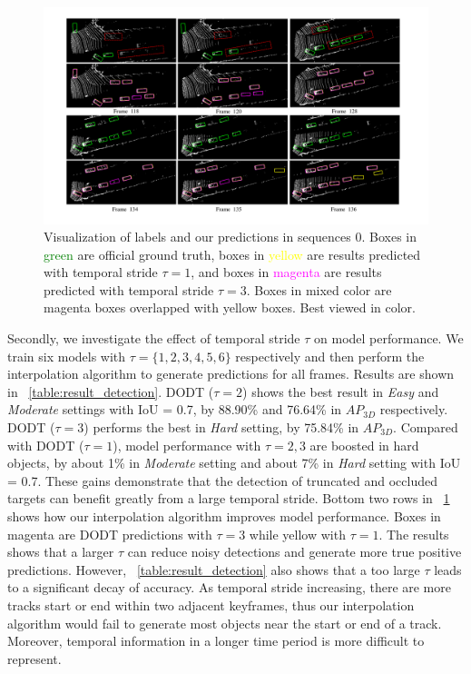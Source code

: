 \documentclass[letterpaper, 10pt, conference]{ieeeconf}  %
\begin{document}
\begin{figure}\centering
	\rule{0pt}{1ex}
	\begin{center}
		\includegraphics[trim={2cm, 1cm, 2cm, 1cm}, clip, width=\textwidth]{images/examples.pdf}
	\end{center}
	\setlength{\abovecaptionskip}{-3pt} 
	\caption{Visualization of labels and our predictions in sequences 0. Boxes in \textcolor{green}{green} are official ground truth, boxes in \textcolor{yellow}{yellow} are results predicted with temporal stride $\tau = 1$, and boxes in \textcolor{magenta}{magenta} are results predicted with temporal stride $\tau = 3$. Boxes in mixed color are magenta boxes overlapped with yellow boxes. Best viewed in color.}
	\label{fig:examples}
	\vspace{-0.4cm}
\end{figure}

Secondly, we investigate the effect of temporal stride $\tau$ on model performance. We train six models with $\tau = \{1, 2, 3, 4, 5, 6\}$ respectively and then perform the interpolation algorithm to generate predictions for all frames. Results are shown in \tablename \, \ref{table:result_detection}. DODT ($\tau = 2$) shows the best result in \textit{Easy} and \textit{Moderate} settings with IoU = 0.7, by 88.90\% and 76.64\% in $AP_{3D}$ respectively. DODT ($\tau = 3$) performs the best in \textit{Hard} setting, by 75.84\% in $AP_{3D}$. Compared with DODT ($\tau = 1$), model performance with $\tau = 2, 3$ are boosted in hard objects, by about 1\% in \textit{Moderate} setting and about 7\% in \textit{Hard} setting with IoU = 0.7. These gains demonstrate that the detection of truncated and occluded targets can benefit greatly from a large temporal stride. Bottom two rows in \figurename \, \ref{fig:examples} shows how our interpolation algorithm improves model performance. Boxes in magenta are DODT predictions with $\tau = 3$ while yellow with $\tau = 1$. The results shows that a larger $\tau$ can reduce noisy detections and generate more true positive predictions. However,  \tablename \, \ref{table:result_detection} also shows that a too large $\tau$ leads to a significant decay of accuracy. As temporal stride increasing, there are more tracks start or end within two adjacent keyframes, thus our interpolation algorithm would fail to generate most objects near the start or end of a track. Moreover, temporal information in a longer time period is more difficult to represent.
\end{document}
